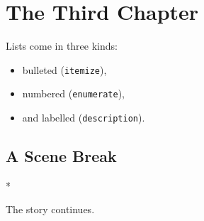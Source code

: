 \chapter{The Third Chapter}
\label{ch:third}

Lists come in three kinds:
\begin{itemize}
  \item bulleted (\verb|itemize|),
  \item numbered (\verb|enumerate|),
  \item and labelled (\verb|description|).
\end{itemize}

\section*{A Scene Break}
\begin{center}* \quad * \quad *\end{center}
The story continues.
